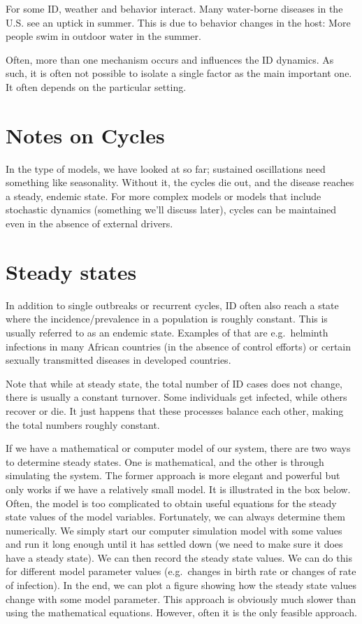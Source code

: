 \documentclass[]{book}
\theoremstyle{definition}
\theoremstyle{definition}
\theoremstyle{definition}
\theoremstyle{remark}
\begin{document}
For some ID, weather and behavior interact. Many water-borne diseases in
the U.S. see an uptick in summer. This is due to behavior changes in the
host: More people swim in outdoor water in the summer.

Often, more than one mechanism occurs and influences the ID dynamics. As
such, it is often not possible to isolate a single factor as the main
important one. It often depends on the particular setting.

\section{Notes on Cycles}\label{notes-on-cycles}

In the type of models, we have looked at so far; sustained oscillations
need something like seasonality. Without it, the cycles die out, and the
disease reaches a steady, endemic state. For more complex models or
models that include stochastic dynamics (something we'll discuss later),
cycles can be maintained even in the absence of external drivers.

\section{Steady states}\label{steady-states}

In addition to single outbreaks or recurrent cycles, ID often also reach
a state where the incidence/prevalence in a population is roughly
constant. This is usually referred to as an endemic state. Examples of
that are e.g.~helminth infections in many African countries (in the
absence of control efforts) or certain sexually transmitted diseases in
developed countries.

Note that while at steady state, the total number of ID cases does not
change, there is usually a constant turnover. Some individuals get
infected, while others recover or die. It just happens that these
processes balance each other, making the total numbers roughly constant.

If we have a mathematical or computer model of our system, there are two
ways to determine steady states. One is mathematical, and the other is
through simulating the system. The former approach is more elegant and
powerful but only works if we have a relatively small model. It is
illustrated in the box below. Often, the model is too complicated to
obtain useful equations for the steady state values of the model
variables. Fortunately, we can always determine them numerically. We
simply start our computer simulation model with some values and run it
long enough until it has settled down (we need to make sure it does have
a steady state). We can then record the steady state values. We can do
this for different model parameter values (e.g.~changes in birth rate or
changes of rate of infection). In the end, we can plot a figure showing
how the steady state values change with some model parameter. This
approach is obviously much slower than using the mathematical equations.
However, often it is the only feasible approach.
\end{document}
